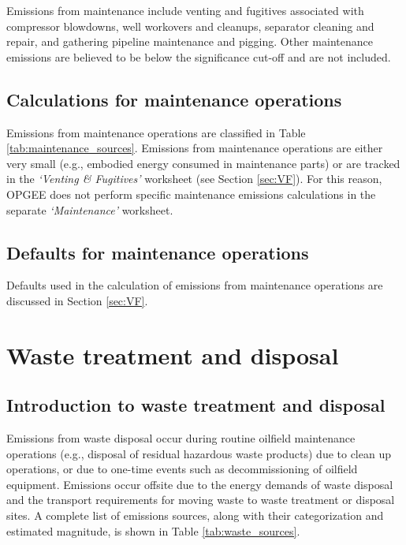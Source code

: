 \documentclass[11pt]{report}
\newcommand{\sheet}[1]{\textit{`{#1}'}}
\begin{document}
{Emissions from maintenance include venting and fugitives associated with compressor blowdowns, well workovers and cleanups, separator cleaning and repair, and gathering pipeline maintenance and pigging. Other maintenance emissions are believed to be below the significance cut-off and are not included.

\subsection{Calculations for maintenance operations}

Emissions from maintenance operations are classified in Table \ref{tab:maintenance_sources}. Emissions from maintenance operations are either very small (e.g., embodied energy consumed in maintenance parts) or are tracked in the \sheet{Venting \& Fugitives} worksheet (see Section \ref{sec:VF}). For this reason, OPGEE does not perform specific maintenance emissions calculations in the separate \sheet{Maintenance} worksheet.

\subsection{Defaults for maintenance operations}

Defaults used in the calculation of emissions from maintenance operations are discussed in Section \ref{sec:VF}.


\clearpage

\section{Waste treatment and disposal}
\label{sec:waste}

\subsection{Introduction to waste treatment and disposal}

Emissions from waste disposal occur during routine oilfield maintenance operations (e.g., disposal of residual hazardous waste products) due to clean up operations, or due to one-time events such as decommissioning of oilfield equipment. Emissions occur offsite due to the energy demands of waste disposal and the transport requirements for moving waste to waste treatment or disposal sites. A complete list of emissions sources, along with their categorization and estimated magnitude, is shown in Table \ref{tab:waste_sources}.


}
\end{document}
